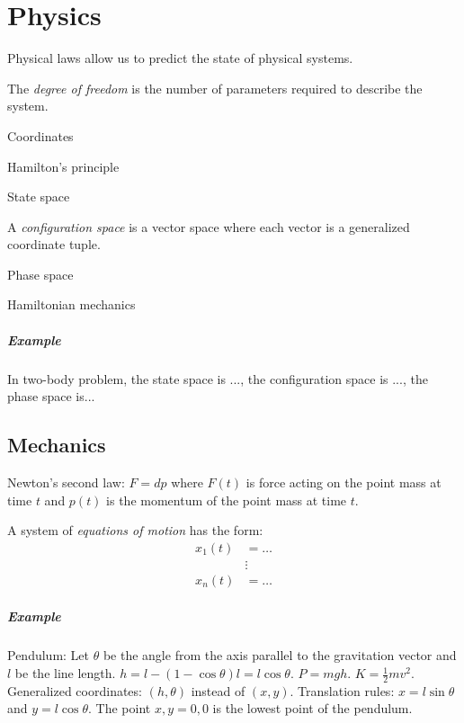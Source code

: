\chapter{Physics}

Physical laws allow us to predict the state of physical systems.

The \emph{degree of freedom} is the number of parameters required to describe the system.

Coordinates

Hamilton's principle

State space

A
%
\emph{configuration space} is a vector space where each vector is a generalized coordinate tuple.

Phase space

Hamiltonian mechanics

\paragraph{Example}
In two-body problem,
the state space is ...,
the configuration space is ...,
the phase space is...

\section{Mechanics}

Newton's second law:
\(F = dp\) where \(F(t)\) is force acting on the point mass at time \(t\)
and \(p(t)\) is the momentum of the point mass at time \(t\).

A system of \emph{equations of motion} has the form:
\begin{align*}
    x_1(t) &= \ldots
    \\
    & \vdots
    \\
    x_n(t) &= \ldots
\end{align*}

\paragraph{Example}
Pendulum:
Let \(\theta\) be the angle from the axis parallel to the gravitation vector
and \(l\) be the line length.
\(h = l - (1 - \cos \theta) l = l \cos \theta\).
\(P = m g h\).
\(K = \frac{1}{2} m v^2\).
Generalized coordinates: \((h,\theta)\) instead of \((x,y)\).
Translation rules: \(x = l \sin \theta\) and \(y = l \cos \theta\).
The point \(x,y=0,0\) is the lowest point of the pendulum.

